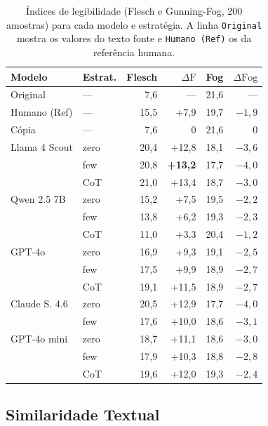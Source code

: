 \documentclass[a4paper, twocolumn, 11pt, twoside]{article}
\begin{document}
\begin{table}[htbp]
\centering
\caption{Índices de legibilidade (Flesch e Gunning-Fog, 200 amostras)
         para cada modelo e estratégia. A linha {\tt Original} mostra
         os valores do texto fonte e {\tt Humano (Ref)} os da
         referência humana.}
\label{tab:legibilidade}
\footnotesize
\setlength{\tabcolsep}{3pt}
\begin{tabular}{l l r r r r}
\toprule
Modelo & Estrat. & Flesch & $\Delta \mathrm{F}$ & Fog & $\Delta \mathrm{Fog}$\\
\midrule
Original    & --- &  7,6 & ---   & 21,6 & --- \\
Humano (Ref)& --- & 15,5 & +7,9  & 19,7 & $-1,9$ \\
Cópia       & --- &  7,6 & 0     & 21,6 & 0 \\
\midrule
Llama 4 Scout & zero & 20,4 & +12,8 & 18,1 & $-3,6$ \\
               & few  & 20,8 & \textbf{+13,2} & 17,7 & \textbf{$-4,0$} \\
               & CoT  & 21,0 & +13,4 & 18,7 & $-3,0$ \\
\midrule
Qwen 2.5 7B   & zero & 15,2 & +7,5  & 19,5 & $-2,2$ \\
               & few  & 13,8 & +6,2  & 19,3 & $-2,3$ \\
               & CoT  & 11,0 & +3,3  & 20,4 & $-1,2$ \\
\midrule
GPT-4o         & zero & 16,9 & +9,3  & 19,1 & $-2,5$ \\
                 & few  & 17,5 & +9,9  & 18,9 & $-2,7$ \\
                 & CoT  & 19,1 & +11,5 & 18,9 & $-2,7$ \\
\midrule
Claude S. 4.6  & zero & 20,5 & +12,9 & 17,7 & $-4,0$ \\
                & few  & 17,6 & +10,0 & 18,6 & $-3,1$ \\
\midrule
GPT-4o mini   & zero & 18,7 & +11,1 & 18,6 & $-3,0$ \\
                & few  & 17,9 & +10,3 & 18,8 & $-2,8$ \\
                & CoT  & 19,6 & +12,0 & 19,3 & $-2,4$ \\
\bottomrule
\end{tabular}
\end{table}

\subsection{Similaridade Textual}
\end{document}
